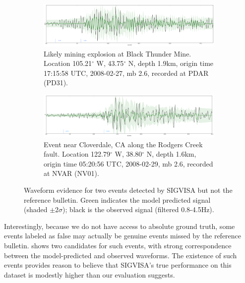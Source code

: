 \documentclass[twoside]{article} \usepackage{aistats2017}
\renewcommand{\deg}{\ensuremath{^\circ}}
\begin{document}
\begin{figure}
\centering
\begin{subfigure}[b]{0.45\textwidth}
    \includegraphics[width=\textwidth]{pd31_missed}
    \caption{Likely mining explosion at Black Thunder Mine. Location 105.21$\deg$ W, 43.75$\deg$ N, depth 1.9km, origin time 17:15:58 UTC, 2008-02-27, mb 2.6, recorded at PDAR (PD31).}
\end{subfigure}

\begin{subfigure}[b]{0.45\textwidth}
    \includegraphics[width=\textwidth]{nv01_missed}
    \caption{Event near Cloverdale, CA along the Rodgers Creek
      fault. Location 122.79$\deg$ W, 38.80$\deg$ N, depth 1.6km,
      origin time 05:20:56 UTC, 2008-02-29,  mb 2.6, recorded at NVAR
      (NV01).}
\end{subfigure}
\caption{Waveform evidence for two events detected by SIGVISA
  but not the reference bulletin. Green indicates the model
  predicted signal (shaded $\pm 2\sigma$); black is the observed
signal (filtered 0.8-4.5Hz).}
  \label{fig:sigvisa_genuine_evs}
\end{figure}

Interestingly, because we do not have access to absolute ground
truth, some events labeled as false may actually be genuine events missed
by the reference bulletin.  shows two
candidates for such events, with strong correspondence between the model-predicted and observed
waveforms. The existence of such events provides reason to believe
that SIGVISA's true performance on this dataset is modestly higher than our evaluation
suggests. 
\end{document}
